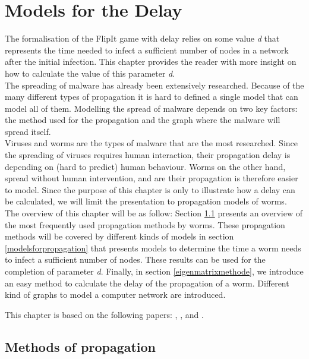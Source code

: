 \chapter{Models for the Delay}
\label{chapter4: Worm propagation}



The formalisation of the FlipIt game with delay relies on some value  \textit{d} that represents the time needed to infect a sufficient number of nodes in a network after the initial infection. This chapter provides the reader with more insight on how to calculate the value of this parameter \textit{d}.  \\

The  spreading of malware has already been extensively researched. Because of the many different types of propagation it is hard to defined a single model that can model all of them. Modelling the spread of malware depends on two key factors: the method used for the propagation and the graph where the malware will spread itself. \\
Viruses and worms are the types of malware that are the most researched. Since the spreading of viruses requires human interaction, their propagation delay is depending on (hard to predict) human behaviour. Worms on the other hand, spread without human intervention, and are their propagation is therefore easier to model. Since the purpose of this chapter is only to illustrate how a delay can be calculated, we will limit the presentation to propagation models of worms. \\

The overview of this chapter will be as follow: Section \ref{methodsofpropagation} presents an overview of the most frequently used propagation methods by worms. These propagation methods will be covered by different kinds of models in section \ref{modelsforpropagation} that presents models to determine the time a worm needs to infect a sufficient number of nodes. These results can be used for the completion of parameter \textit{d}. Finally, in section \ref{eigenmatrixmethode},  we introduce an easy method to calculate the delay of the propagation of a worm.  Different kind of graphs to model a computer network are introduced. 

This chapter is based on the following papers: \cite{importantjournal}, \cite{OnWorms2005survey}, \cite{GameTheorApprCostBenefitAnalyses} and \cite{SecurelistAPT}.


\section{Methods of propagation}
\label{methodsofpropagation}

